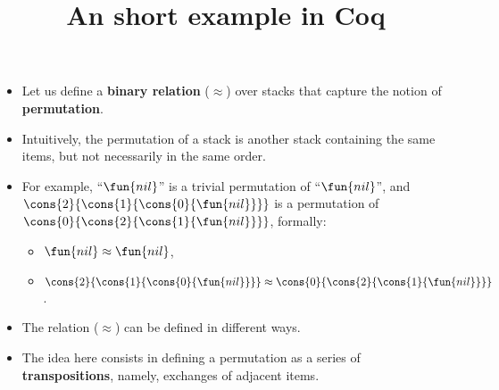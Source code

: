 \documentclass[wide]{slides}
\begin{document}
\begin{slide}
  \title{An short example in Coq}

  \begin{itemize}

    \item Let us define a \textbf{binary relation} (\(\approx\)) over
      stacks that capture the notion of \textbf{permutation}.

    \item Intuitively, the permutation of a stack is another stack
      containing the same items, but not necessarily in the same
      order.

    \item For example, ``\(\fun{nil}\)'' is a trivial permutation of
      ``\(\fun{nil}\)'', and
      \(\cons{2}{\cons{1}{\cons{0}{\fun{nil}}}}\) is a permutation of
      \(\cons{0}{\cons{2}{\cons{1}{\fun{nil}}}}\), formally:
      \begin{itemize}

        \item \(\fun{nil} \approx \fun{nil}\),

        \item \(\cons{2}{\cons{1}{\cons{0}{\fun{nil}}}} \approx
          \cons{0}{\cons{2}{\cons{1}{\fun{nil}}}}\).

      \end{itemize}

    \item The relation (\(\approx\)) can be defined in different
      ways.

    \item The idea here consists in defining a permutation as a series
      of \textbf{transpositions}, namely, exchanges of adjacent items.

  \end{itemize}

\end{slide}
\end{document}
